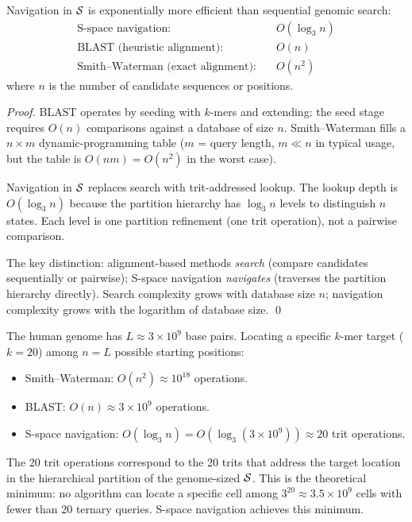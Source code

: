 \begin{corollary}
\label{cor:complexity_comparison}
Navigation in $\mathcal{S}$ is exponentially more efficient than sequential
genomic search:
\begin{align}
  \text{S-space navigation:} & \quad O(\log_3 n) \\
  \text{BLAST (heuristic alignment):} & \quad O(n) \\
  \text{Smith--Waterman (exact alignment):} & \quad O(n^2)
\end{align}
where $n$ is the number of candidate sequences or positions.
\end{corollary}

\begin{proof}
BLAST operates by seeding with $k$-mers and extending: the seed stage requires
$O(n)$ comparisons against a database of size $n$. Smith--Waterman fills a
$n \times m$ dynamic-programming table ($m$ = query length, $m \ll n$ in
typical usage, but the table is $O(nm) = O(n^2)$ in the worst case).

Navigation in $\mathcal{S}$ replaces search with trit-addressed lookup. The lookup
depth is $O(\log_3 n)$ because the partition hierarchy has $\log_3 n$ levels
to distinguish $n$ states. Each level is one partition refinement (one trit
operation), not a pairwise comparison.

The key distinction: alignment-based methods \emph{search} (compare candidates
sequentially or pairwise); S-space navigation \emph{navigates} (traverses the
partition hierarchy directly). Search complexity grows with database size $n$;
navigation complexity grows with the logarithm of database size. \qed
\end{proof}

\begin{example}
\label{ex:genome_navigation}
The human genome has $L \approx 3 \times 10^9$ base pairs. Locating a specific
$k$-mer target ($k = 20$) among $n = L$ possible starting positions:
\begin{itemize}
  \item Smith--Waterman: $O(n^2) \approx 10^{18}$ operations.
  \item BLAST: $O(n) \approx 3 \times 10^9$ operations.
  \item S-space navigation: $O(\log_3 n) = O(\log_3(3 \times 10^9)) \approx 20$ trit operations.
\end{itemize}
The 20 trit operations correspond to the 20 trits that address the target
location in the hierarchical partition of the genome-sized $\mathcal{S}$. This
is the theoretical minimum: no algorithm can locate a specific cell among
$3^{20} \approx 3.5 \times 10^9$ cells with fewer than 20 ternary queries.
S-space navigation achieves this minimum.
\end{example}

